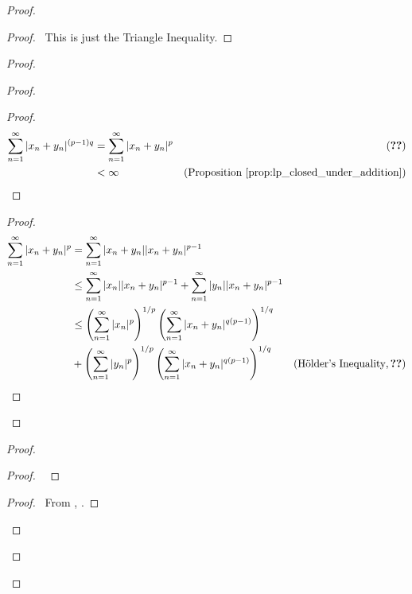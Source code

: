 \documentclass{book}
\let\qed\relax
\theoremstyle{definition}
\begin{document}
\begin{proof}
\pf
{}
\begin{proof}
	\pf\ This is just the Triangle Inequality.
\end{proof}
\begin{proof}
	\begin{proof}
		\pf
		\begin{proof}
			\pf
			\begin{align*}
				\sum_{n=1}^\infty |x_n + y_n|^{(p-1)q} & = \sum_{n=1}^\infty |x_n + y_n|^p & (\text{\stepref{b}}) \\
				& < \infty & (\text{Proposition \ref{prop:lp_closed_under_addition}})
			\end{align*}
		\end{proof}
		\qedstep
		\begin{proof}
		\pf
		\begin{align*}
			\sum_{n=1}^\infty |x_n + y_n|^p
			& = \sum_{n=1}^\infty |x_n + y_n| |x_n + y_n|^{p-1} \\
			& \leq \sum_{n=1}^\infty |x_n| |x_n + y_n|^{p-1} + \sum_{n=1}^\infty |y_n| |x_n + y_n|^{p-1} \\
			& \leq \left( \sum_{n=1}^\infty |x_n|^p \right)^{1/p} \left( \sum_{n=1}^\infty |x_n + y_n|^{q(p-1)} \right)^{1/q} \\
	& + \left( \sum_{n=1}^\infty |y_n|^p \right)^{1/p} \left( \sum_{n=1}^\infty |x_n + y_n|^{q(p-1)} \right)^{1/q} & (\text{H\"{o}lder's Inequality}, \text{\stepref{b}})
		\end{align*}
		\end{proof}
	\end{proof}
	\begin{proof}
		\begin{proof}
			\pf\ 
		\end{proof}
		\qedstep
		\begin{proof}
			\pf\ From , .
		\end{proof}
	\end{proof}
\end{proof}
\qed
\end{proof}
\end{document}
